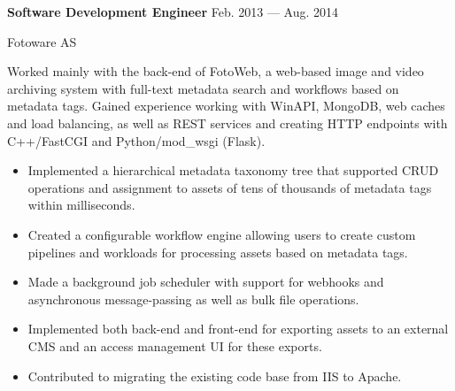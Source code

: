 \parbox[t][][t]{\linewidth}{
	\parbox{\linewidth}{{\textbf{Software Development Engineer}}
		\hfill {{Feb. 2013 --- Aug. 2014}}}
		\smallbreak
	\parbox{\linewidth}{Fotoware AS}

	\bigskip
	Worked mainly with the back-end of FotoWeb, a web-based image and video
	archiving system with full-text metadata search and workflows based on
	metadata tags. Gained experience working with WinAPI, MongoDB, web
	caches and load balancing, as well as REST services and creating HTTP endpoints with C++/FastCGI and Python/mod\_wsgi (Flask).

	\bigskip
	\begin{itemize}
		\item{Implemented a hierarchical metadata taxonomy tree that
			supported CRUD operations and assignment to assets of tens of thousands of metadata tags within
			milliseconds.}\\[-.6em]
		\item{Created a configurable workflow engine allowing users to
			create custom pipelines and workloads for processing assets based on
			metadata tags.}\\[-.6em]
		\item{Made a background job scheduler with support for
			webhooks and asynchronous message-passing as well as
			bulk file operations.}\\[-.6em]
		\item{Implemented both back-end and front-end for exporting
			assets to an external CMS and an access 
			management UI for these exports.}\\[-.6em]
		\item{Contributed to migrating the existing code base from IIS to Apache.}
	\end{itemize}
}
